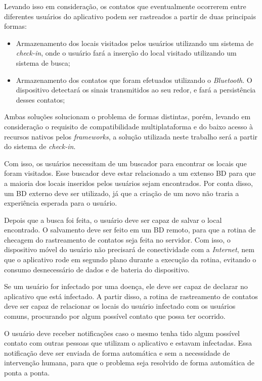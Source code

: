 Levando isso em consideração, os contatos que eventualmente ocorrerem entre diferentes usuários do aplicativo podem ser rastreados a partir de duas principais formas: 

\begin{itemize}
  \item Armazenamento dos locais visitados pelos usuários utilizando um sistema de \textit{check-in}, onde o usuário fará a inserção do local visitado utilizando um sistema de busca;
  \item Armazenamento dos contatos que foram efetuados utilizando o \textit{Bluetooth}. O dispositivo detectará os sinais transmitidos ao seu redor, e fará a persistência desses contatos;
\end{itemize}

Ambas soluções solucionam o problema de formas distintas, porém, levando em consideração o requisito de compatibilidade multiplataforma e do baixo acesso à recursos nativos pelos \textit{frameworks}, a solução utilizada neste trabalho será a partir do sistema de \textit{check-in}.

Com isso, os usuários necessitam de um buscador para encontrar os locais que foram visitados. Esse buscador deve estar relacionado a um extenso BD para que a maioria dos locais inseridos pelos usuários sejam encontrados. Por conta disso, um BD externo deve ser utilizado, já que a criação de um novo não traria a experiência esperada para o usuário.

Depois que a busca foi feita, o usuário deve ser capaz de salvar o local encontrado. O salvamento deve ser feito em um BD remoto, para que a rotina de checagem do rastreamento de contatos seja feita no servidor. Com isso, o dispositivo móvel do usuário não precisará de conectividade com a \textit{Internet}, nem que o aplicativo rode em segundo plano durante a execução da rotina, evitando o consumo desnecessário de dados e de bateria do dispositivo.

Se um usuário for infectado por uma doença, ele deve ser capaz de declarar no aplicativo que está infectado. A partir disso, a rotina de rastreamento de contatos deve ser capaz de relacionar os locais do usuário infectado com os usuários comuns, procurando por algum possível contato que possa ter ocorrido.

O usuário deve receber notificações caso o mesmo tenha tido algum possível contato com outras pessoas que utilizam o aplicativo e estavam infectadas. Essa notificação deve ser enviada de forma automática e sem a necessidade de intervenção humana, para que o problema seja resolvido de forma automática de ponta a ponta.

